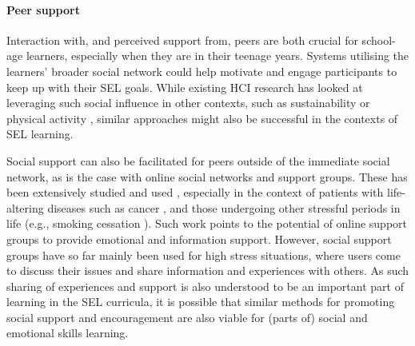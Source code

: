 \documentclass[prodmode,acmtochi]{acmsmall}
\newcommand{\todo}[1]{\textrm{\textrm{\textcolor{LightBlue}{[[#1]]}}}}
\newcommand{\todolater}[1]{}
\begin{document}
\paragraph{Peer support}
Interaction with, and perceived support from, peers are both crucial for school-age learners, especially when they are in their teenage years. Systems utilising the learners' broader social network could help motivate and engage participants to keep up with their SEL goals. While existing HCI research has looked at leveraging such social influence in other contexts, such as sustainability \cite{Gustafsson2009,Thieme2012a} or physical activity \cite{Lin2006,Gasser2006}, similar approaches might also be successful in the contexts of  SEL learning. 
\todolater{bringing interesting questions around what might be tracked, compared etc.}
%
%
%
Social support can also be facilitated for peers outside of the immediate social network, as is the case with online social networks and support groups. These has been extensively studied and used \cite{Barak2008,Newman2011}, especially in the context of patients with life-altering diseases such as cancer \cite{Skeels2010}, and those undergoing other stressful periods in life (e.g., smoking cessation \cite{Ploderer2013}). Such work points to the potential of online support groups to provide emotional and information support.  %
However, social support groups have so far mainly been used for high stress situations, where users come to discuss their issues and share information and  experiences with others. As such sharing of experiences and support is also understood to be an important part of learning in the SEL curricula, it is possible that similar methods for promoting social support and encouragement are also viable for (parts of) social and emotional skills learning. %
\end{document}
